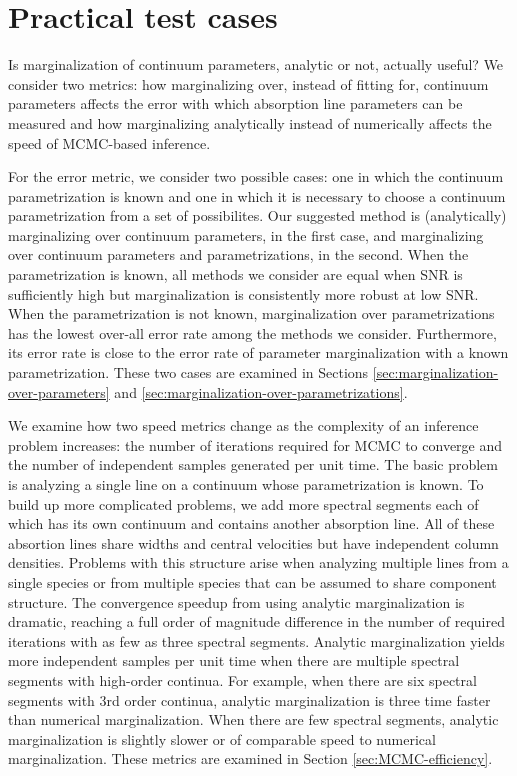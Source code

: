 \documentclass[manuscript]{aastex62}
\begin{document}
\section{Practical test cases}
\label{sec:test-cases}
Is marginalization of continuum parameters, analytic or not, actually useful?
We consider two metrics: how marginalizing over, instead of fitting for, continuum parameters affects the error with which absorption line parameters can be measured and how marginalizing analytically instead of numerically affects the speed of MCMC-based inference.

For the error metric, we consider two possible cases: one in which the continuum parametrization is known and one in which it is necessary to choose a continuum parametrization from a set of possibilites.
Our suggested method is (analytically) marginalizing over continuum parameters, in the first case, and marginalizing over continuum parameters and parametrizations, in the second.
When the parametrization is known, all methods we consider are equal when SNR is sufficiently high but marginalization is consistently more robust at low SNR.
When the parametrization is not known, marginalization over parametrizations has the lowest over-all error rate among the methods we consider.
Furthermore, its error rate is close to the error rate of parameter marginalization with a known parametrization.
These two cases are examined in Sections \ref{sec:marginalization-over-parameters} and \ref{sec:marginalization-over-parametrizations}.

We examine how two speed metrics change as the complexity of an inference problem increases: the number of iterations required for MCMC to converge and the number of independent samples generated per unit time.
The basic problem is analyzing a single line on a continuum whose parametrization is known.
To build up more complicated problems, we add more spectral segments each of which has its own continuum and contains another absorption line.
All of these absortion lines share widths and central velocities but have independent column densities.
Problems with this structure arise when analyzing multiple lines from a single species or from multiple species that can be assumed to share component structure.
The convergence speedup from using analytic marginalization is dramatic, reaching a full order of magnitude difference in the number of required iterations with as few as three spectral segments.
Analytic marginalization yields more independent samples per unit time when there are multiple spectral segments with high-order continua.
For example, when there are six spectral segments with 3rd order continua, analytic marginalization is three time faster than numerical marginalization.
When there are few spectral segments, analytic marginalization is slightly slower or of comparable speed to numerical marginalization.
These metrics are examined in Section \ref{sec:MCMC-efficiency}.
\end{document}
